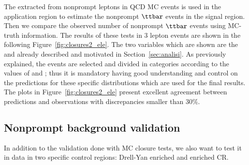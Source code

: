 The \fr extracted from nonprompt leptons in QCD MC events is
used in the application region to estimate the nonprompt $\ttbar$
events in the signal region. Then we compare the observed number of
nonprompt $\ttbar$ events using MC-truth information. The results of
these tests in 3 lepton events are shown in the following
Figure~\ref{fig:closures2_ele}. The two variables which are shown are
the \mmin and \mlll already described and motivated in
Section~\ref{sec:analisi}.
As previously explained, the events are selected and divided in
categories according to the values of \mmin and \mlll; thus it is
mandatory having good understanding and control on the predictions for
these specific distributions which are used for the final results. \\
The plots in Figure~\ref{fig:closures2_ele} present excellent
agreement between predictions and observations with discrepancies 
smaller than 30\%.


\subsection{Nonprompt background validation}
In addition to the validation done with MC closure tests, we also want
to test it in data in two specific control regions: Drell-Yan
enriched and \ttbar enriched CR.
